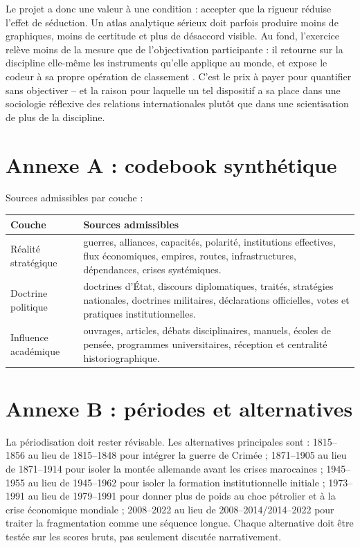 \documentclass[11pt,a4paper]{article}
\begin{document}
Le projet a donc une valeur à une condition : accepter que la rigueur réduise l'effet de séduction. Un atlas analytique sérieux doit parfois produire moins de graphiques, moins de certitude et plus de désaccord visible. Au fond, l'exercice relève moins de la mesure que de l'objectivation participante : il retourne sur la discipline elle-même les instruments qu'elle applique au monde, et expose le codeur à sa propre opération de classement \citep{bourdieu1976champ,hoffmann1977american}. C'est le prix à payer pour quantifier sans objectiver -- et la raison pour laquelle un tel dispositif a sa place dans une sociologie réflexive des relations internationales plutôt que dans une scientisation de plus de la discipline.




\appendix

\section{Annexe A : codebook synthétique}

Sources admissibles par couche :

\begin{center}
\begin{tabular}{p{4cm}p{9cm}}
\hline
Couche & Sources admissibles \\
\hline
Réalité stratégique & guerres, alliances, capacités, polarité, institutions effectives, flux économiques, empires, routes, infrastructures, dépendances, crises systémiques. \\
Doctrine politique & doctrines d'État, discours diplomatiques, traités, stratégies nationales, doctrines militaires, déclarations officielles, votes et pratiques institutionnelles. \\
Influence académique & ouvrages, articles, débats disciplinaires, manuels, écoles de pensée, programmes universitaires, réception et centralité historiographique. \\
\hline
\end{tabular}
\end{center}

\section{Annexe B : périodes et alternatives}

La périodisation doit rester révisable. Les alternatives principales sont : 1815--1856 au lieu de 1815--1848 pour intégrer la guerre de Crimée ; 1871--1905 au lieu de 1871--1914 pour isoler la montée allemande avant les crises marocaines ; 1945--1955 au lieu de 1945--1962 pour isoler la formation institutionnelle initiale ; 1973--1991 au lieu de 1979--1991 pour donner plus de poids au choc pétrolier et à la crise économique mondiale ; 2008--2022 au lieu de 2008--2014/2014--2022 pour traiter la fragmentation comme une séquence longue. Chaque alternative doit être testée sur les scores bruts, pas seulement discutée narrativement.
\end{document}
